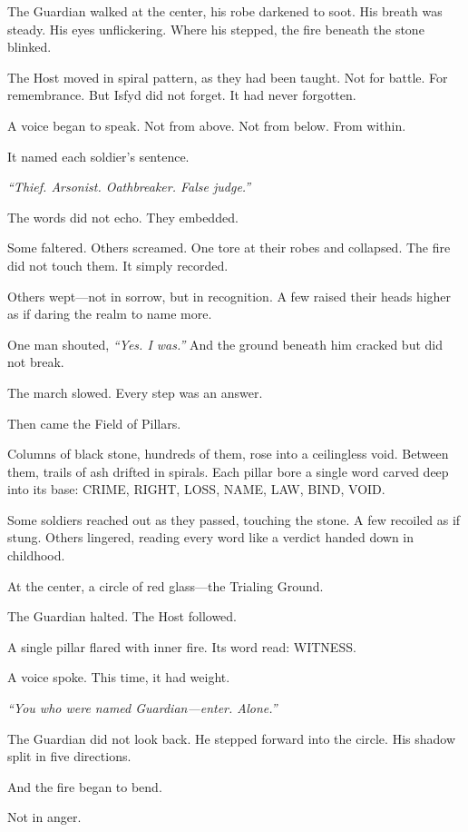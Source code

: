 \documentclass[9pt]{article}
\begin{document}
The Guardian walked at the center, his robe darkened to soot. His breath was steady. His eyes unflickering. Where his stepped, the fire beneath the stone blinked.

The Host moved in spiral pattern, as they had been taught. Not for battle. For remembrance. But Isfyd did not forget. It had never forgotten.

A voice began to speak. Not from above. Not from below. From within.

It named each soldier’s sentence.

\textit{``Thief. Arsonist. Oathbreaker. False judge.''}

The words did not echo. They embedded.

Some faltered. Others screamed. One tore at their robes and collapsed. The fire did not touch them. It simply recorded.

Others wept—not in sorrow, but in recognition. A few raised their heads higher as if daring the realm to name more.

One man shouted, \textit{``Yes. I was.''} And the ground beneath him cracked but did not break.

The march slowed. Every step was an answer.

Then came the Field of Pillars.

Columns of black stone, hundreds of them, rose into a ceilingless void. Between them, trails of ash drifted in spirals. Each pillar bore a single word carved deep into its base: \textsc{CRIME}, \textsc{RIGHT}, \textsc{LOSS}, \textsc{NAME}, \textsc{LAW}, \textsc{BIND}, \textsc{VOID}.

Some soldiers reached out as they passed, touching the stone. A few recoiled as if stung. Others lingered, reading every word like a verdict handed down in childhood.

At the center, a circle of red glass—the Trialing Ground.

The Guardian halted. The Host followed.

A single pillar flared with inner fire. Its word read: \textsc{WITNESS}.

A voice spoke. This time, it had weight.

\textit{``You who were named Guardian—enter. Alone.''}

The Guardian did not look back. He stepped forward into the circle. His shadow split in five directions.

And the fire began to bend.

Not in anger.
\end{document}
